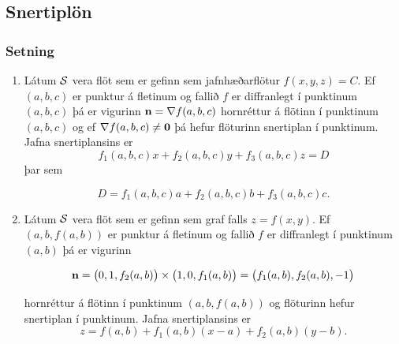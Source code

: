 \subsection{Snertiplön} 

\subsubsection{Setning  }
\begin {enumerate}
 \item  Látum $\cal S$ vera flöt sem er gefinn sem jafnhæðarflötur 
     $f(x,y,z)=C$.   Ef $(a, b, c)$ er punktur á fletinum og
     fallið $f$ er diffranlegt í punktinum $(a, b,c)$ þá er vigurinn
     $\mbox{${\bf n}$}=\nabla f(a, b, c)$ hornréttur á flötinn í punktinum $(a,b, c)$ og ef $\nabla f(a, b, c)\neq \mbox{${\bf 0}$}$ þá hefur
flöturinn snertiplan í punktinum.  Jafna
     snertiplansins er
$$f_1(a, b, c)x+f_2(a, b, c)y+f_3(a, b, c)z=D$$ 
þar sem 

$$D= f_1(a, b, c)a+f_2(a, b, c)b
+f_3(a, b, c)c.$$

    \item
   Látum $\cal S$ vera flöt sem er gefinn sem graf falls 
     $z=f(x,y)$.   Ef $(a, b, f(a,b))$ er punktur á fletinum og
     fallið $f$ er diffranlegt í punktinum $(a, b)$ þá er vigurinn
     
     $$\mbox{${\bf n}$} =\big(0 ,1 ,f_2(a, b)\big)\times\big(1 ,0 ,f_1(a, b)\big)=\big(f_1(a, b), f_2(a, b), -1\big)$$ 

hornréttur á flötinn í punktinum $(a,b, f(a,b))$ og flöturinn hefur snertiplan í punktinum.  Jafna snertiplansins er
$$z=f(a, b)+f_1(a, b)(x-a)+f_2(a, b)(y-b).$$
\end{enumerate}
 

